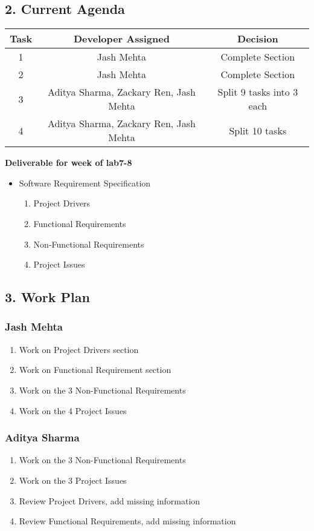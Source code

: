 \documentclass[11pt, oneside]{article}   	%
\begin{document}
\setlength{\headsep}{25pt}
\subsection*{2. Current Agenda}

\begin{center}
\begin{tabular}{ | c | c | c | }
\hline
Task & Developer Assigned & Decision \\
\hline
1 & Jash Mehta & Complete Section\\
\hline 
2 & Jash Mehta & Complete Section \\
\hline
3 & Aditya Sharma, Zackary Ren, Jash Mehta & Split 9 tasks into 3 each \\
\hline
4 & Aditya Sharma, Zackary Ren, Jash Mehta & Split 10 tasks\\
\hline 
\end{tabular}
\end{center}


\textbf{Deliverable for week of lab7-8}
\begin{itemize}
\item Software Requirement Specification
\begin{enumerate}
\item Project Drivers
\item Functional Requirements
\item Non-Functional Requirements
\item Project Issues
\end{enumerate}
\end{itemize}
\newpage{}

\setlength{\headsep}{25pt}
\subsection*{3. Work Plan}
\subsubsection*{Jash Mehta}
\begin{enumerate}
\item Work on Project Drivers section
\item Work on Functional Requirement section
\item Work on the 3 Non-Functional Requirements
\item Work on the 4 Project Issues
\end{enumerate}

\subsubsection*{Aditya Sharma}
\begin{enumerate}
\item Work on the 3 Non-Functional Requirements
\item Work on the 3 Project Issues
\item Review Project Drivers, add missing information
\item Review Functional Requirements, add missing information
\end{enumerate}
\end{document}
